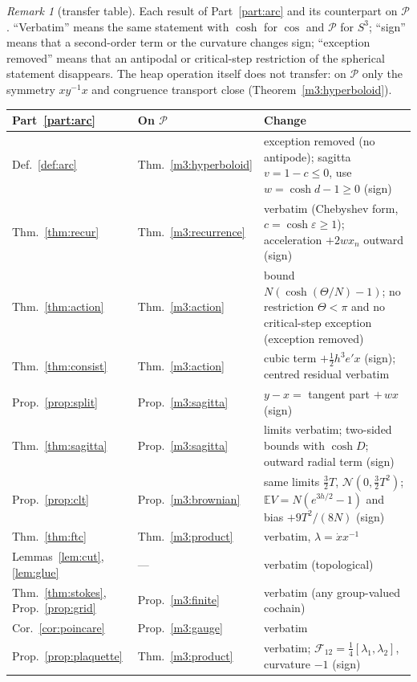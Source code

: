 \documentclass[11pt,reqno]{amsart}
\theoremstyle{definition}
\theoremstyle{remark}
\newtheorem{remark}[theorem]{Remark}
\numberwithin{equation}{section}
\begin{document}
\begin{remark}[transfer table]\label{m3:transfer}
Each result of Part~\ref{part:arc} and its counterpart on $\mathcal P$.  ``Verbatim'' means the same statement with $\cosh$ for $\cos$ and
$\mathcal P$ for $S^3$; ``sign'' means that a second-order term or the curvature changes sign; ``exception removed'' means that an
antipodal or critical-step restriction of the spherical statement disappears.  The heap operation itself does not transfer: on
$\mathcal P$ only the symmetry $xy^{-1}x$ and congruence transport close (Theorem~\ref{m3:hyperboloid}).
\begin{center}\footnotesize
\begin{tabular}{p{}p{}p{}}
Part~\ref{part:arc} & On $\mathcal P$ & Change\\ \hline
Def.~\ref{def:arc} & Thm.~\ref{m3:hyperboloid} & exception removed (no antipode); sagitta $v=1-c\le0$, use $w=\cosh d-1\ge0$ (sign)\\
Thm.~\ref{thm:recur} & Thm.~\ref{m3:recurrence} & verbatim (Chebyshev form, $c=\cosh\varepsilon\ge1$); acceleration $+2wx_n$ outward (sign)\\
Thm.~\ref{thm:action} & Thm.~\ref{m3:action} & bound $N(\cosh(\Theta/N)-1)$; no restriction $\Theta<\pi$ and no critical-step exception (exception removed)\\
Thm.~\ref{thm:consist} & Thm.~\ref{m3:action} & cubic term $+\tfrac12h^3e'x$ (sign); centred residual verbatim\\
Prop.~\ref{prop:split} & Prop.~\ref{m3:sagitta} & $y-x=$ tangent part $+\,wx$ (sign)\\
Thm.~\ref{thm:sagitta} & Prop.~\ref{m3:sagitta} & limits verbatim; two-sided bounds with $\cosh D$; outward radial term (sign)\\
Prop.~\ref{prop:clt} & Prop.~\ref{m3:brownian} & same limits $\tfrac32T$, $\mathcal N(0,\tfrac32T^2)$; $\mathbb EV=N(e^{3h/2}-1)$ and bias $+9T^2/(8N)$ (sign)\\
Thm.~\ref{thm:ftc} & Thm.~\ref{m3:product} & verbatim, $\lambda=\dot xx^{-1}$\\
Lemmas~\ref{lem:cut}, \ref{lem:glue} & --- & verbatim (topological)\\
Thm.~\ref{thm:stokes}, Prop.~\ref{prop:grid} & Prop.~\ref{m3:finite} & verbatim (any group-valued cochain)\\
Cor.~\ref{cor:poincare} & Prop.~\ref{m3:gauge} & verbatim\\
Prop.~\ref{prop:plaquette} & Thm.~\ref{m3:product} & verbatim; $\mathcal F_{12}=\tfrac14[\lambda_1,\lambda_2]$, curvature $-1$ (sign)\\

\end{tabular}
\end{center}
\end{remark}
\end{document}
